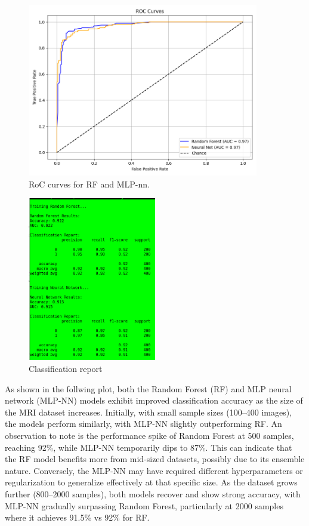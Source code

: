 \documentclass[11pt,a4paper]{article}
\begin{document}
		\begin{figure}[H]
			\centering
			\includegraphics[width=0.9\textwidth]{images/roc_curves_all_features.png}
			\caption{RoC curves for RF and MLP-nn.}
			\label{fig1:}
		\end{figure}		

		\begin{figure}[H]
			\centering
			\includegraphics[width=0.5\textwidth]{images/report_all_features.png}
			\caption{Classification report}
			\label{fig1:}
		\end{figure}		


		

		As shown in the follwing plot, both the Random Forest (RF) and MLP neural network (MLP-NN) models 
		exhibit improved classification accuracy as the size of the MRI dataset increases. 
		Initially, with small sample sizes (100–400 images), the models perform similarly, 
		with MLP-NN slightly outperforming RF.
		An observation to note is the performance spike of Random Forest at 500 samples, reaching 92\%, 
		while MLP-NN temporarily dips to 87\%.
		This can indicate that the RF model benefits more from mid-sized datasets, 
		possibly due to its ensemble nature. Conversely, the MLP-NN may have required 
		different hyperparameters or regularization to generalize effectively at that specific size.
		As the dataset grows further (800–2000 samples), both models recover and show strong accuracy, 
		with MLP-NN gradually surpassing Random Forest, particularly at 2000 samples where it achieves 91.5\% vs 92\% for RF. 
\end{document}
